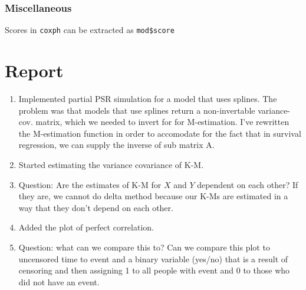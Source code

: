 \documentclass[]{article}
\begin{document}
\clearpage

\subsubsection{Miscellaneous}
Scores in \texttt{coxph} can be extracted as \texttt{mod\$score}

\section{Report}
\begin{enumerate}
  \item Implemented partial PSR simulation for a model that uses splines. The problem was that models that use splines return a non-invertable variance-cov. matrix, which we needed to invert for for M-estimation. I've rewritten the M-estimation function in order to accomodate for the fact that in survival regression, we can supply the inverse of sub matrix A.
  \item Started estimating the variance covariance of K-M.
  \item Question: Are the estimates of K-M for $X$ and $Y$ dependent on each other? If they are, we cannot do delta method because our K-Ms are estimated in a way that they don't depend on each other.
  \item Added the plot of perfect correlation.
  \item Question: what can we compare this to? Can we compare this plot to uncensored time to event and a binary variable (yes/no) that is a result of censoring and then assigning 1 to all people with event and 0 to those who did not have an event.
\end{enumerate}
\end{document}

